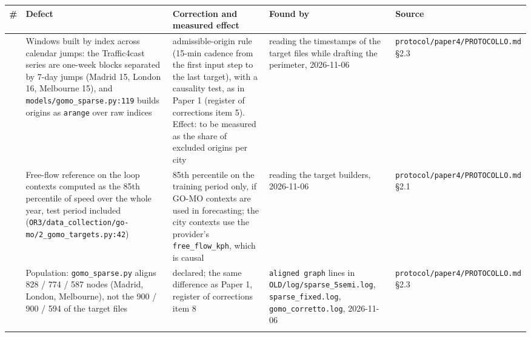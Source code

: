 {\scriptsize
\begin{longtable}{>{\raggedright\arraybackslash}p{}>{\raggedright\arraybackslash}p{}>{\raggedright\arraybackslash}p{}>{\raggedright\arraybackslash}p{}>{\raggedright\arraybackslash}p{}}
\toprule
\textbf{\#} & \textbf{Defect} & \textbf{Correction and measured effect} & \textbf{Found by} & \textbf{Source} \\
\midrule
\endhead
1 & Windows built by index across calendar jumps: the Traffic4cast series are one-week blocks separated by 7-day jumps (Madrid 15, London 16, Melbourne 15), and \texttt{models/\allowbreak{}gomo\_\allowbreak{}sparse.\allowbreak{}py:119} builds origins as \texttt{arange} over raw indices & admissible-origin rule (15-min cadence from the first input step to the last target), with a causality test, as in Paper 1 (register of corrections item 5). Effect: to be measured as the share of excluded origins per city & reading the timestamps of the target files while drafting the perimeter, 2026-11-06 & \texttt{protocol/\allowbreak{}paper4/\allowbreak{}PROTOCOLLO.\allowbreak{}md} §2.3 \\ \addlinespace
2 & Free-flow reference on the loop contexts computed as the 85th percentile of speed over the whole year, test period included (\texttt{OR3/\allowbreak{}data\_\allowbreak{}collection/\allowbreak{}go-\allowbreak{}mo/\allowbreak{}2\_\allowbreak{}gomo\_\allowbreak{}targets.\allowbreak{}py:42}) & 85th percentile on the training period only, if GO-MO contexts are used in forecasting; the city contexts use the provider's \texttt{free\_\allowbreak{}flow\_\allowbreak{}kph}, which is causal & reading the target builders, 2026-11-06 & \texttt{protocol/\allowbreak{}paper4/\allowbreak{}PROTOCOLLO.\allowbreak{}md} §2.1 \\ \addlinespace
3 & Population: \texttt{gomo\_\allowbreak{}sparse.\allowbreak{}py} aligns 828 / 774 / 587 nodes (Madrid, London, Melbourne), not the 900 / 900 / 594 of the target files & declared; the same difference as Paper 1, register of corrections item 8 & \texttt{aligned graph} lines in \texttt{OLD/\allowbreak{}log/\allowbreak{}sparse\_\allowbreak{}5semi.\allowbreak{}log}, \texttt{sparse\_\allowbreak{}fixed.\allowbreak{}log}, \texttt{gomo\_\allowbreak{}corretto.\allowbreak{}log}, 2026-11-06 & \texttt{protocol/\allowbreak{}paper4/\allowbreak{}PROTOCOLLO.\allowbreak{}md} §2.3 \\ \addlinespace

\end{longtable}}
